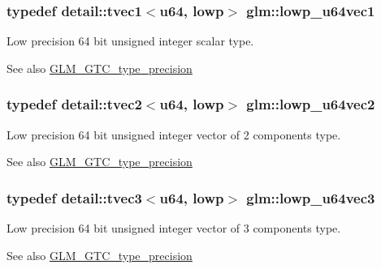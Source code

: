 \subsubsection[{\texorpdfstring{lowp\+\_\+u64vec1}{lowp_u64vec1}}]{\setlength{\rightskip}{0pt plus 5cm}typedef detail\+::tvec1$<$u64, lowp$>$ {\bf glm\+::lowp\+\_\+u64vec1}}\hypertarget{group__gtc__type__precision_gacd97dc5e92d0e2f6f6d62a5160508e2a}{}\label{group__gtc__type__precision_gacd97dc5e92d0e2f6f6d62a5160508e2a}
Low precision 64 bit unsigned integer scalar type. \begin{DoxySeeAlso}{See also}
\hyperlink{group__gtc__type__precision}{G\+L\+M\+\_\+\+G\+T\+C\+\_\+type\+\_\+precision} 
\end{DoxySeeAlso}
\subsubsection[{\texorpdfstring{lowp\+\_\+u64vec2}{lowp_u64vec2}}]{\setlength{\rightskip}{0pt plus 5cm}typedef detail\+::tvec2$<$u64, lowp$>$ {\bf glm\+::lowp\+\_\+u64vec2}}\hypertarget{group__gtc__type__precision_gae0e7d3ed32e8e79b4f6dd0c9baafcaea}{}\label{group__gtc__type__precision_gae0e7d3ed32e8e79b4f6dd0c9baafcaea}
Low precision 64 bit unsigned integer vector of 2 components type. \begin{DoxySeeAlso}{See also}
\hyperlink{group__gtc__type__precision}{G\+L\+M\+\_\+\+G\+T\+C\+\_\+type\+\_\+precision} 
\end{DoxySeeAlso}
\subsubsection[{\texorpdfstring{lowp\+\_\+u64vec3}{lowp_u64vec3}}]{\setlength{\rightskip}{0pt plus 5cm}typedef detail\+::tvec3$<$u64, lowp$>$ {\bf glm\+::lowp\+\_\+u64vec3}}\hypertarget{group__gtc__type__precision_gaa62794e3f055a333a85c0e52376f2429}{}\label{group__gtc__type__precision_gaa62794e3f055a333a85c0e52376f2429}
Low precision 64 bit unsigned integer vector of 3 components type. \begin{DoxySeeAlso}{See also}
\hyperlink{group__gtc__type__precision}{G\+L\+M\+\_\+\+G\+T\+C\+\_\+type\+\_\+precision} 
\end{DoxySeeAlso}

